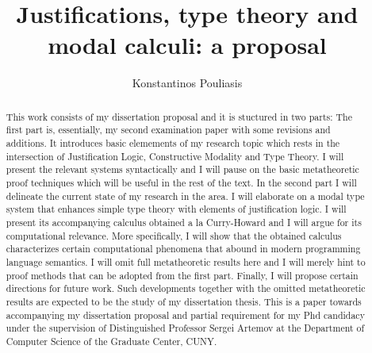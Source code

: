 \documentclass[12pt]{report}
\title{Justifications, type theory and modal calculi: a proposal}
\author{Konstantinos Pouliasis}
\begin{document}
\maketitle


\begin{abstract}
This work consists of my dissertation proposal and  it is stuctured in two parts: 
The first part is, essentially, my second examination paper with some revisions and additions. It  introduces basic elemements of my research topic which rests in 
the intersection of Justification Logic, Constructive Modality and Type Theory. I will present the relevant systems syntactically and I will pause on the basic metatheoretic
proof techniques which will be useful in the rest of the text.
In the second part I will delineate the current state of my research in the area.
I will elaborate on a modal type system that enhances simple type theory with elements of justification logic. I will present its accompanying calculus 
 obtained  a la Curry-Howard and I will argue for its computational relevance. More specifically, I will show  
that the obtained calculus characterizes  certain computational phenomena that abound in modern programming language semantics. 
I will omit full metatheoretic
results here and  I will merely hint to  proof methods that can be adopted from the first part. Finally,  I will propose certain
directions for future work. Such developments together with the omitted metatheoretic results are expected to be the study of my dissertation thesis.
This is a  paper towards accompanying my dissertation proposal and partial requirement  for my Phd candidacy under the supervision of Distinguished Professor Sergei Artemov at the Department of Computer Science of the Graduate Center, CUNY.
\end{abstract}
\tableofcontents










\nocite{Pfenning2009a, Pfenning2009b}




\end{document}
